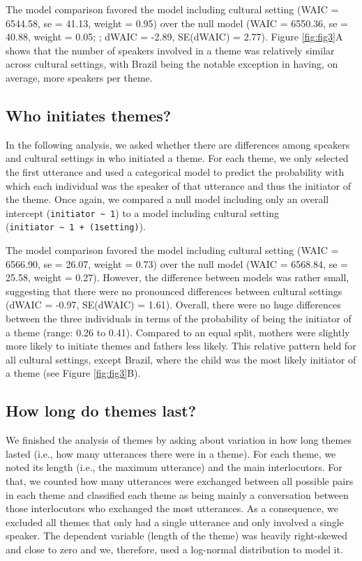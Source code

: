 \documentclass[
  man,floatsintext]{apa6}
\begin{document}
The model comparison favored the model including cultural setting (WAIC = 6544.58, se = 41.13, weight = 0.95) over the null model (WAIC = 6550.36, se = 40.88, weight = 0.05; ; dWAIC = -2.89, SE(dWAIC) = 2.77). Figure \ref{fig:fig3}A shows that the number of speakers involved in a theme was relatively similar across cultural settings, with Brazil being the notable exception in having, on average, more speakers per theme.

\hypertarget{who-initiates-themes}{%
\subsection{Who initiates themes?}\label{who-initiates-themes}}

In the following analysis, we asked whether there are differences among speakers and cultural settings in who initiated a theme. For each theme, we only selected the first utterance and used a categorical model to predict the probability with which each individual was the speaker of that utterance and thus the initiator of the theme. Once again, we compared a null model including only an overall intercept (\texttt{initiator\ \textasciitilde{}\ 1}) to a model including cultural setting (\texttt{initiator\ \textasciitilde{}\ 1\ +\ (1\textbar{}setting)}).

The model comparison favored the model including cultural setting (WAIC = 6566.90, se = 26.07, weight = 0.73) over the null model (WAIC = 6568.84, se = 25.58, weight = 0.27). However, the difference between models was rather small, suggesting that there were no pronounced differences between cultural settings (dWAIC = -0.97, SE(dWAIC) = 1.61). Overall, there were no huge differences between the three individuals in terms of the probability of being the initiator of a theme (range: 0.26 to 0.41). Compared to an equal split, mothers were slightly more likely to initiate themes and fathers less likely. This relative pattern held for all cultural settings, except Brazil, where the child was the most likely initiator of a theme (see Figure \ref{fig:fig3}B).

\hypertarget{how-long-do-themes-last}{%
\subsection{How long do themes last?}\label{how-long-do-themes-last}}

We finished the analysis of themes by asking about variation in how long themes lasted (i.e., how many utterances there were in a theme). For each theme, we noted its length (i.e., the maximum utterance) and the main interlocutors. For that, we counted how many utterances were exchanged between all possible pairs in each theme and classified each theme as being mainly a conversation between those interlocutors who exchanged the most utterances. As a consequence, we excluded all themes that only had a single utterance and only involved a single speaker. The dependent variable (length of the theme) was heavily right-skewed and close to zero and we, therefore, used a log-normal distribution to model it.
\end{document}
